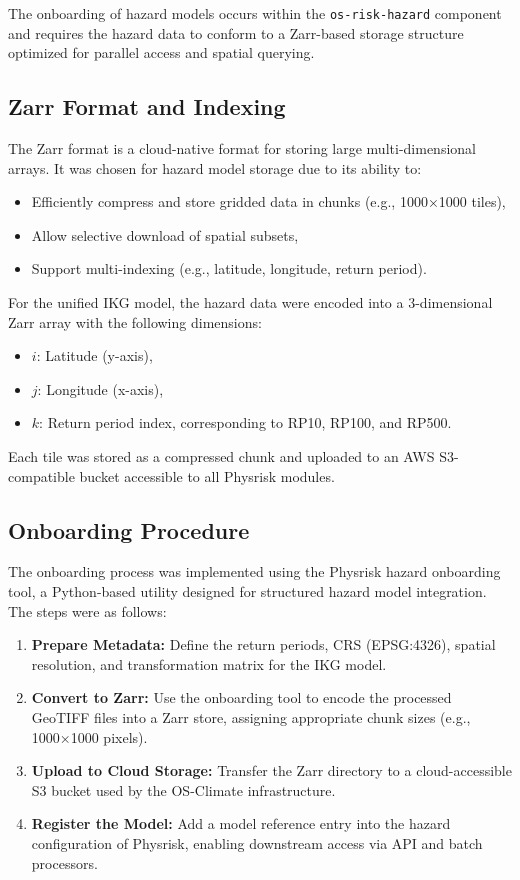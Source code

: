 The onboarding of hazard models occurs within the \texttt{os-risk-hazard} component and requires the hazard data to conform to a Zarr-based storage structure optimized for parallel access and spatial querying.

\subsection{Zarr Format and Indexing}

The Zarr format is a cloud-native format for storing large multi-dimensional arrays. It was chosen for hazard model storage due to its ability to:
\begin{itemize}
    \item Efficiently compress and store gridded data in chunks (e.g., 1000×1000 tiles),
    \item Allow selective download of spatial subsets,
    \item Support multi-indexing (e.g., latitude, longitude, return period).
\end{itemize}

For the unified IKG model, the hazard data were encoded into a 3-dimensional Zarr array with the following dimensions:
\begin{itemize}
    \item $i$: Latitude (y-axis),
    \item $j$: Longitude (x-axis),
    \item $k$: Return period index, corresponding to RP10, RP100, and RP500.
\end{itemize}

Each tile was stored as a compressed chunk and uploaded to an AWS S3-compatible bucket accessible to all Physrisk modules.

\subsection{Onboarding Procedure}

The onboarding process was implemented using the Physrisk hazard onboarding tool, a Python-based utility designed for structured hazard model integration. The steps were as follows:

\begin{enumerate}
    \item \textbf{Prepare Metadata:} Define the return periods, CRS (EPSG:4326), spatial resolution, and transformation matrix for the IKG model.
    
    \item \textbf{Convert to Zarr:} Use the onboarding tool to encode the processed GeoTIFF files into a Zarr store, assigning appropriate chunk sizes (e.g., 1000×1000 pixels).
    
    \item \textbf{Upload to Cloud Storage:} Transfer the Zarr directory to a cloud-accessible S3 bucket used by the OS-Climate infrastructure.
    
    \item \textbf{Register the Model:} Add a model reference entry into the hazard configuration of Physrisk, enabling downstream access via API and batch processors.
\end{enumerate}

